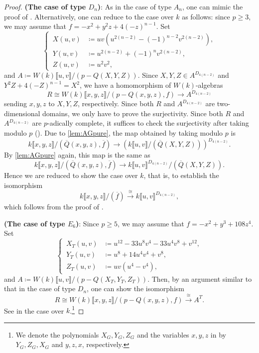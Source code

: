 \documentclass[uplatex,11pt,a4paper]{amsart} %
\numberwithin{equation}{section}
\numberwithin{figure}{section}
\numberwithin{table}{section}
\theoremstyle{plain}
\theoremstyle{definition}
\newcommand{\ol}{\overline}
\newcommand{\xr}{\xrightarrow}
\begin{document}
\begin{proof}
\textbf{(The case of type $D_n$)}:
As in the case of type $A_n$, one can mimic the proof of \cite[Corollary 3.10]{Has15}. Alternatively, one can reduce to the case over $k$ as follows: since $p\geq 3$, we may assume that $f=-x^2+y^2z+4(-z)^{n-1}$. Set
\begin{equation*}
\left\{ \,
    \begin{aligned}
    X(u,v) &\coloneqq uv(u^{2(n-2)}-(-1)^{n-2}v^{2(n-2)}), \\
    Y(u,v) &\coloneqq u^{2(n-2)}+(-1)^nv^{2(n-2)}, \\
    Z(u,v) &\coloneqq u^2v^2,
    \end{aligned}
\right.
\end{equation*}
and $A\coloneqq W(k)\llbracket u,v\rrbracket/(p-Q(X,Y,Z))$.
Since $X,Y,Z\in A^{D_{4(n-2)}}$ and $Y^2Z+4(-Z)^{n-1}=X^2$, we have a homomorphism of $W(k)$-algebras
\[
R\cong W(k)\llbracket x,y,z\rrbracket/(p-Q(x,y,z),f) \to A^{D_{4(n-2)}}
\]
sending $x,y,z$ to $X,Y,Z$, respectively. Since both $R$ and $A^{D_{4(n-2)}}$ are two-dimensional domains, we only have to prove the surjectivity. Since both $R$ and $A^{D_{4(n-2)}}$ are $p$-adically complete, it suffices to check the surjectivity after taking modulo $p$ (\cite[Theorem 8.4]{Mat2}). Due to \cref{lem:AGpure}, the map obtained by taking modulo $p$ is
\[
k\llbracket x,y,z\rrbracket/(\ol{Q}(x,y,z),\ol{f}) \to \left( k\llbracket u,v\rrbracket/(\ol{Q}(X,Y,Z))\right)^{D_{4(n-2)}}.
\]
By \cref{lem:AGpure} again, this map is the same as
\[
k\llbracket x,y,z\rrbracket/(\ol{Q}(x,y,z),\ol{f}) \to k\llbracket u,v\rrbracket^{D_{4(n-2)}}/(\ol{Q}(X,Y,Z)).
\]
Hence we are reduced to show the case over $k$, that is, to establish the isomorphism
\[
k\llbracket x,y,z\rrbracket/(\ol{f}) \xr{\cong} k\llbracket u,v\rrbracket^{D_{4(n-2)}},
\]
which follows from the proof of \cite[Corollary 3.10]{Has15}.

\textbf{(The case of type $E_6$)}: Since $p\geq 5$, we may assume that $f=-x^2+y^3+108z^4$. Set
\begin{equation*}
\left\{ \,
    \begin{aligned}
    X_T(u,v) &\coloneqq u^{12}-33u^8v^4-33u^4v^8+v^{12},\\
    Y_T(u,v) &\coloneqq u^8+14u^4v^4+v^8,\\
    Z_T(u,v) &\coloneqq uv(u^4-v^4),
    \end{aligned}
\right.
\end{equation*}
and $A\coloneqq W(k)\llbracket u,v\rrbracket/(p-Q(X_T,Y_T,Z_T))$.
Then, by an argument similar to that in the case of type $D_n$, one can show the isomorphism
\[
R\cong W(k)\llbracket x,y,z\rrbracket/(p-Q(x,y,z),f) \xr{\cong} A^T.
\]
See \cite[6.15]{LW} in the case over $k$.\footnote{We denote the polynomials $X_G,Y_G,Z_G$ and the variables $x,y,z$ in \cite{LW} by $Y_G,Z_G,X_G$ and $y,z,x$, respectively.}


\end{proof}
\end{document}

